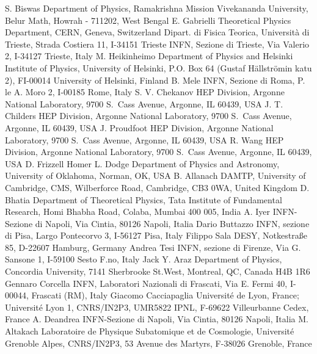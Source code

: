S. Biswas {Department of Physics, Ramakrishna Mission Vivekananda University, Belur Math, Howrah - 711202, West Bengal}
E. Gabrielli {Theoretical Physics Department, CERN, Geneva, Switzerland} {Dipart. di Fisica Teorica, Universit\`a di Trieste, Strada Costiera 11, I-34151 Trieste} {INFN, Sezione di Trieste, Via Valerio 2, I-34127 Trieste, Italy}
M. Heikinheimo {Department of Physics and Helsinki Institute of Physics, University of Helsinki, P.O. Box 64 (Gustaf H\"allstr\"omin katu 2), FI-00014 University of Helsinki, Finland}
B. Mele {INFN, Sezione di Roma, P. le A. Moro 2, I-00185 Rome, Italy}
S. V. Chekanov {HEP Division, Argonne National Laboratory, 9700 S.~Cass Avenue, Argonne, IL 60439, USA}
J. T. Childers {HEP Division, Argonne National Laboratory, 9700 S.~Cass Avenue, Argonne, IL 60439, USA}
J. Proudfoot {HEP Division, Argonne National Laboratory, 9700 S.~Cass Avenue, Argonne, IL 60439, USA}
R. Wang {HEP Division, Argonne National Laboratory, 9700 S.~Cass Avenue, Argonne, IL 60439, USA}
D. Frizzell {Homer L. Dodge Department of Physics and Astronomy, University of Oklahoma, Norman, OK, USA}
B. Allanach {DAMTP, University of Cambridge, CMS, Wilberforce Road, Cambridge, CB3 0WA, United Kingdom}
D. Bhatia {Department of Theoretical Physics, Tata Institute of Fundamental Research, Homi Bhabha Road, Colaba, Mumbai 400 005, India}
A. Iyer {INFN-Sezione di Napoli, Via Cintia, 80126 Napoli, Italia}
Dario Buttazzo {INFN, sezione di Pisa, Largo Pontecorvo 3, I-56127 Pisa, Italy}
Filippo Sala {DESY, Notkestra\ss e 85, D-22607 Hamburg, Germany}
Andrea Tesi {INFN, sezione di Firenze, Via G. Sansone 1, I-59100 Sesto F.no, Italy}
Jack Y. Araz {Department of Physics, Concordia University, 7141 Sherbrooke St.West, Montreal, QC, Canada H4B 1R6}
Gennaro Corcella {INFN, Laboratori Nazionali di Frascati, Via E. Fermi 40, I-00044, Frascati (RM), Italy}
Giacomo Cacciapaglia {Universit\'e de Lyon, France; Universit\'e Lyon 1, CNRS/IN2P3, UMR5822 IPNL, F-69622 Villeurbanne Cedex, France}
A. Deandrea {INFN-Sezione di Napoli, Via Cintia, 80126 Napoli, Italia}
M. Altakach {Laboratoire de Physique Subatomique et de Cosmologie, Universit\'e Grenoble Alpes, CNRS/IN2P3, 53 Avenue des Martyrs, F-38026 Grenoble, France}
